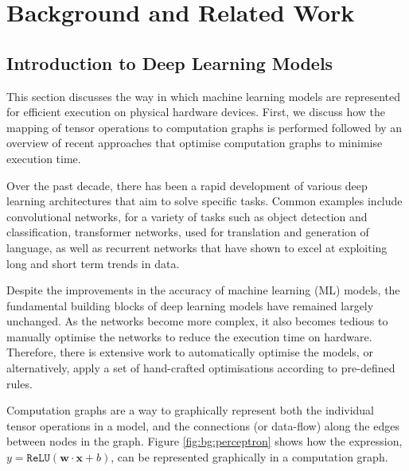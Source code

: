 \chapter{Background and Related Work}

\section{Introduction to Deep Learning Models}
This section discusses the way in which machine learning models are represented for efficient execution on physical hardware devices. First, we discuss how the mapping of tensor operations to computation graphs is performed followed by an overview of recent approaches that optimise computation graphs to minimise execution time.

Over the past decade, there has been a rapid development of various deep learning architectures that aim to solve specific tasks. Common examples include convolutional networks, for a variety of tasks such as object detection and classification, transformer networks, used for translation and generation of language, as well as recurrent networks that have shown to excel at exploiting long and short term trends in data.

Despite the improvements in the accuracy of machine learning (ML) models, the fundamental building blocks of deep learning models have remained largely unchanged. As the networks become more complex, it also becomes tedious to manually optimise the networks to reduce the execution time on hardware. Therefore, there is extensive work to automatically optimise the models, or alternatively, apply a set of hand-crafted optimisations according to pre-defined rules.

Computation graphs are a way to graphically represent both the individual tensor operations in a model, and the connections (or data-flow) along the edges between nodes in the graph. Figure \ref{fig:bg:perceptron} shows how the expression, $y = \texttt{ReLU}(\mathbf{w} \cdot \mathbf{x} + b)$, can be represented graphically in a computation graph.

